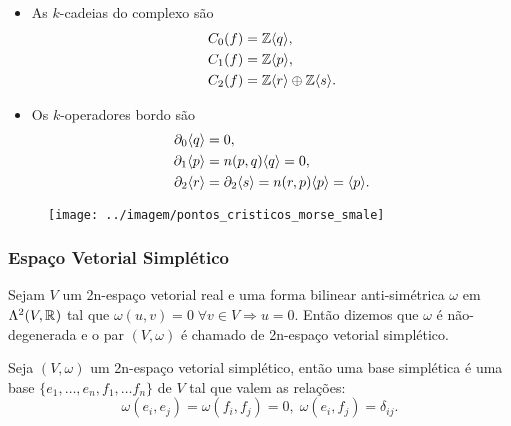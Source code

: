 \documentclass{beamer}
\begin{document}
	\begin{frame}
		
		\begin{minipage}[t]{0.5\linewidth}
			\begin{itemize}
				\item As $k$-cadeias do complexo são
				$$
				\begin{aligned}
				C_{0}(f) &= \mathbb{Z}\langle q\rangle, 
				\\
				C_{1}(f) &= \mathbb{Z}\langle p\rangle,
				\\
				C_{2}(f) &= \mathbb{Z}\langle r\rangle\oplus\mathbb{Z}\langle s\rangle.
				\end{aligned}
				$$
				
				\item Os $k$-operadores bordo são
				$$
				\begin{aligned}
				\partial_{0}\langle q\rangle &=0, 
				\\
				\partial_{1}\langle p\rangle &=n(p,q)\langle q\rangle = 0,
				\\
				\partial_{2}\langle r\rangle&=\partial_{2}\langle s\rangle = n(r,p)\langle p\rangle = \langle p\rangle.
				\end{aligned}
				$$
				
			\end{itemize}
		\end{minipage}
		\hfill%
		\begin{minipage}[t]{0.4\linewidth}
			\begin{figure}
				\centering
				\textbf{}\par
				\texttt{[image: ../imagem/pontos\_cristicos\_morse\_smale]}
			\end{figure}
			
		\end{minipage}
		
	\end{frame}
	

	\begin{frame}
		\frametitle{Espaço Vetorial Simplético}
		\begin{definicao}
			Sejam $V$ um 2n-espaço vetorial real e uma forma bilinear anti-simétrica $\omega$ em $\Lambda^{2}(V, \mathbb{R}^{})$ tal que $\omega(u,v) = 0 \; \forall v \in V \Rightarrow u=0$. Então dizemos que $\omega$ é não-degenerada e o par $(V, \omega)$ é chamado de 2n-espaço vetorial simplético.
		\end{definicao}
		\begin{definicao}
			Seja $(V, \omega)$ um 2n-espaço vetorial simplético, então uma base simplética é uma base $\{ e_{1},\dots, e_{n},f_{1},\dots f_{n}\}$ de $V$ tal que valem as relações:
			$$
			\omega(e_{i}, e_{j}) = \omega(f_{i}, f_{j}) = 0, \; \omega(e_{i}, f_{j}) = \delta_{ij}.
			$$
		\end{definicao}
		
	\end{frame}
	
\end{document}
